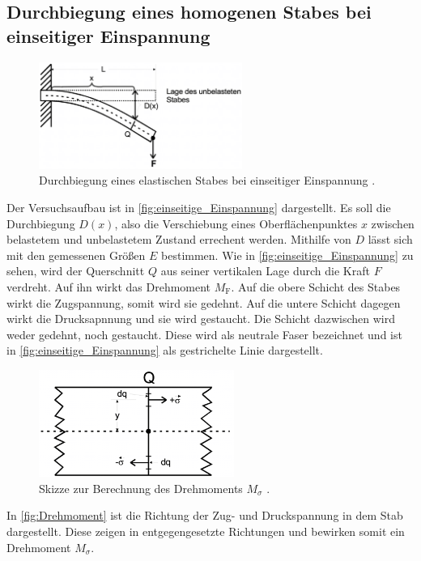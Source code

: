 \subsection{Durchbiegung eines homogenen Stabes bei einseitiger Einspannung}
\begin{figure}
    \centering
    \includegraphics[height=3.5cm]{Abbildungen/einseitige_Einspannung.pdf}
    \caption{Durchbiegung eines elastischen Stabes bei einseitiger Einspannung \cite{V103_Anleitung}.}
    \label{fig:einseitige_Einspannung}
\end{figure}\noindent
Der Versuchsaufbau ist in \autoref{fig:einseitige_Einspannung} dargestellt.
Es soll die Durchbiegung $D(x)$, also die Verschiebung eines Oberflächenpunktes $x$ zwischen belastetem 
und unbelastetem Zustand errechent werden.
Mithilfe von $D$ lässt sich mit den gemessenen Größen $E$ bestimmen.
Wie in \autoref{fig:einseitige_Einspannung} zu sehen, wird der Querschnitt $Q$ aus seiner vertikalen Lage durch die Kraft $F$ verdreht.
Auf ihn wirkt das Drehmoment $M_\text{F}$.
Auf die obere Schicht des Stabes wirkt die Zugspannung, somit wird sie gedehnt.
Auf die untere Schicht dagegen wirkt die Drucksapnnung und sie wird gestaucht.
Die Schicht dazwischen wird weder gedehnt, noch gestaucht.
Diese wird als neutrale Faser bezeichnet und ist in \autoref{fig:einseitige_Einspannung} als gestrichelte Linie dargestellt.
\begin{figure}
    \centering
    \includegraphics[height=3.5cm]{Abbildungen/Skizze_Drehmoment.pdf}
    \caption{Skizze zur Berechnung des Drehmoments $M_\sigma$ \cite{V103_Anleitung}.}
    \label{fig:Drehmoment}
\end{figure}
In \autoref{fig:Drehmoment} ist die Richtung der Zug- und Druckspannung in dem Stab dargestellt.
Diese zeigen in entgegengesetzte Richtungen und bewirken somit ein Drehmoment $M_\sigma$.
